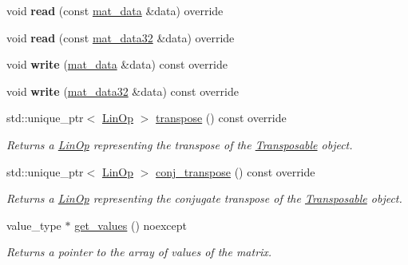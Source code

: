 \begin{DoxyCompactItemize}
\item 
\mbox{\label{classgko_1_1matrix_1_1Dense_ad8015737f260f0338e8a5c79a44f34c6}} 
void {\bfseries read} (const \hyperlink{structgko_1_1matrix__data}{mat\+\_\+data} \&data) override
\item 
\mbox{\label{classgko_1_1matrix_1_1Dense_a61d639ee160909a2a9c1b0489508f353}} 
void {\bfseries read} (const \hyperlink{structgko_1_1matrix__data}{mat\+\_\+data32} \&data) override
\item 
\mbox{\label{classgko_1_1matrix_1_1Dense_a52c0237829d4407e2a6269fdef65533a}} 
void {\bfseries write} (\hyperlink{structgko_1_1matrix__data}{mat\+\_\+data} \&data) const override
\item 
\mbox{\label{classgko_1_1matrix_1_1Dense_ad53f369dd7235e521d9352b393772b24}} 
void {\bfseries write} (\hyperlink{structgko_1_1matrix__data}{mat\+\_\+data32} \&data) const override
\item 
std\+::unique\+\_\+ptr$<$ \hyperlink{classgko_1_1LinOp}{Lin\+Op} $>$ \hyperlink{classgko_1_1matrix_1_1Dense_a64ea8e876f5390a535a2ef486bd5ab9a}{transpose} () const override
\begin{DoxyCompactList}\small\item\em Returns a \hyperlink{classgko_1_1LinOp}{Lin\+Op} representing the transpose of the \hyperlink{classgko_1_1Transposable}{Transposable} object. \end{DoxyCompactList}\item 
std\+::unique\+\_\+ptr$<$ \hyperlink{classgko_1_1LinOp}{Lin\+Op} $>$ \hyperlink{classgko_1_1matrix_1_1Dense_a19890b1448497a50d57c16ed4c3bd820}{conj\+\_\+transpose} () const override
\begin{DoxyCompactList}\small\item\em Returns a \hyperlink{classgko_1_1LinOp}{Lin\+Op} representing the conjugate transpose of the \hyperlink{classgko_1_1Transposable}{Transposable} object. \end{DoxyCompactList}\item 
value\+\_\+type $\ast$ \hyperlink{classgko_1_1matrix_1_1Dense_a3bc458e02fab8e4c9f60f70bd4d5a4f9}{get\+\_\+values} () noexcept
\begin{DoxyCompactList}\small\item\em Returns a pointer to the array of values of the matrix. \end{DoxyCompactList}\item 

\end{DoxyCompactItemize}
